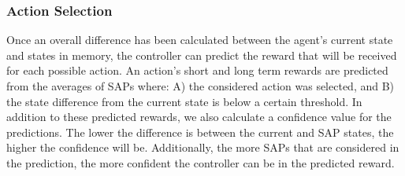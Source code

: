 \subsubsection{Action Selection}
Once an overall difference has been calculated between the agent's current state and states in memory, the controller can predict the reward that will be received for each possible action.
An action's short and long term rewards are predicted from the averages of SAPs where: A) the considered action was selected, and B) the state difference from the current state is below a certain threshold.
In addition to these predicted rewards, we also calculate a confidence value for the predictions.
The lower the difference is between the current and SAP states, the higher the confidence will be.
Additionally, the more SAPs that are considered in the prediction, the more confident the controller can be in the predicted reward.
